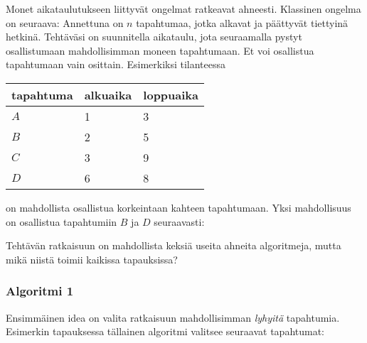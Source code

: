 Monet aikataulutukseen liittyvät ongelmat
ratkeavat ahneesti.
Klassinen ongelma on seuraava:
Annettuna on $n$ tapahtumaa,
jotka alkavat ja päättyvät tiettyinä hetkinä.
Tehtäväsi on suunnitella aikataulu,
jota seuraamalla pystyt osallistumaan
mahdollisimman moneen tapahtumaan.
Et voi osallistua tapahtumaan vain osittain.
Esimerkiksi tilanteessa
\begin{center}
\begin{tabular}{lll}
tapahtuma & alkuaika & loppuaika \\
\hline
$A$ & 1 & 3 \\
$B$ & 2 & 5 \\
$C$ & 3 & 9 \\
$D$ & 6 & 8 \\
\end{tabular}
\end{center}
on mahdollista osallistua korkeintaan
kahteen tapahtumaan.
Yksi mahdollisuus on osallistua tapahtumiin
$B$ ja $D$ seuraavasti:
\begin{center}
\end{center}

Tehtävän ratkaisuun on mahdollista 
keksiä useita ahneita algoritmeja,
mutta mikä niistä toimii kaikissa tapauksissa?

\subsubsection*{Algoritmi 1}

Ensimmäinen idea on valita ratkaisuun
mahdollisimman \emph{lyhyitä} tapahtumia.
Esimerkin tapauksessa tällainen
algoritmi valitsee seuraavat tapahtumat:
\begin{center}
\end{center}

